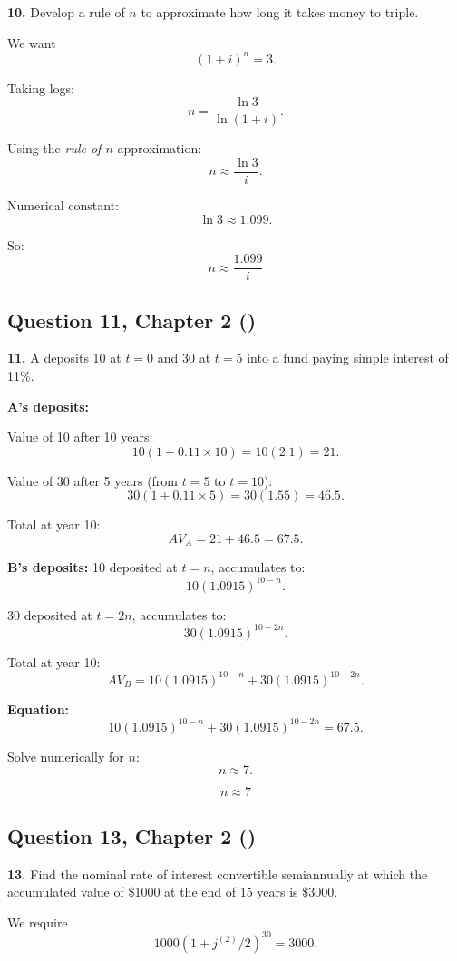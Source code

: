 \documentclass[12pt, a4paper]{article}
\begin{document}
\textbf{10.} Develop a rule of \(n\) to approximate how long it takes money to triple.

We want
\[
(1+i)^n = 3.
\]

Taking logs:
\[
n = \frac{\ln 3}{\ln(1+i)}.
\]

Using the \emph{rule of \(n\)} approximation:
\[
n \approx \frac{\ln 3}{i}.
\]

Numerical constant:
\[
\ln 3 \approx 1.099.
\]

So:
\[
\boxed{n \approx \frac{1.099}{i}}
\]

\subsection*{Question 11, Chapter 2 (\cite{toi3rd})}

\textbf{11.}  
A deposits 10 at \(t=0\) and 30 at \(t=5\) into a fund paying simple interest of 11\%.  

\bigskip
\textbf{A’s deposits:}

Value of 10 after 10 years:
\[
10 \left(1 + 0.11 \times 10\right) = 10(2.1) = 21.
\]

Value of 30 after 5 years (from \(t=5\) to \(t=10\)):
\[
30 \left(1 + 0.11 \times 5\right) = 30(1.55) = 46.5.
\]

Total at year 10:
\[
AV_A = 21 + 46.5 = 67.5.
\]

\bigskip
\textbf{B’s deposits:}  
10 deposited at \(t=n\), accumulates to:
\[
10(1.0915)^{10-n}.
\]

30 deposited at \(t=2n\), accumulates to:
\[
30(1.0915)^{10-2n}.
\]

Total at year 10:
\[
AV_B = 10(1.0915)^{10-n} + 30(1.0915)^{10-2n}.
\]

\bigskip
\textbf{Equation:}
\[
10(1.0915)^{10-n} + 30(1.0915)^{10-2n} = 67.5.
\]

Solve numerically for \(n\):
\[
n \approx 7.
\]

\[
\boxed{n \approx 7}
\]

\subsection*{Question 13, Chapter 2 (\cite{toi3rd})}

\textbf{13.} Find the nominal rate of interest convertible semiannually at which 
the accumulated value of \$1000 at the end of 15 years is \$3000.

\bigskip
We require
\[
1000(1+j^{(2)}/2)^{30} = 3000.
\]
\end{document}
